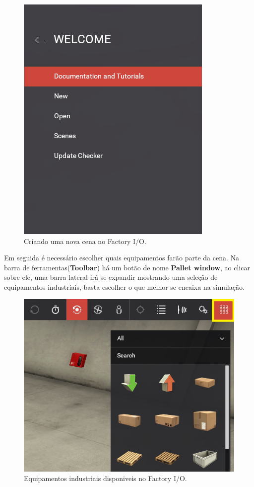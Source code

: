 \documentclass[a4paper, 12pt]{article}
\begin{document}
		\begin{figure}[H]
			\centering
			\includegraphics[scale=0.5]{figures/creating_scene_step_1.png}
			\caption{Criando uma nova cena no Factory I/O.}
			\label{fig:creating-scene-step1}
		\end{figure}
		
		Em seguida é necessário escolher quais equipamentos farão parte da cena. Na barra de ferramentas(\textbf{Toolbar}) há um botão
		de nome \textbf{Pallet window}, ao clicar sobre ele, uma barra lateral irá se expandir mostrando uma seleção de equipamentos
		industriais, basta escolher o que melhor se encaixa na simulação.
		
		\begin{figure}[H]
			\centering
			\includegraphics[scale=0.5]{figures/creating_scene_step_2.png}
			\caption{Equipamentos industriais disponiveis no Factory I/O.}
			\label{fig:creating-scene-step2}
		\end{figure}
		
\end{document}
